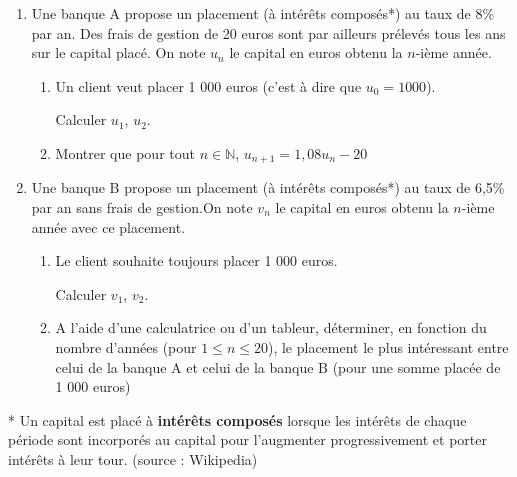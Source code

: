 
\begin{enumerate}
     \item
     Une banque A propose un placement (à intérêts composés*) au taux de 8\% par an. Des frais de gestion de 20 euros sont par ailleurs prélevés tous les ans sur le capital placé. On note $u_{n}$ le capital en euros obtenu la $n$-ième année.
     \begin{enumerate}
          \item
          Un client veut placer 1 000 euros (c'est à dire que $u_{0}=1 000$).
          \par
          Calculer $u_{1}$, $u_{2}$.
          \item
          Montrer que pour tout $n \in  \mathbb{N}$, $u_{n+1}=1,08u_{n}-20$
     \end{enumerate}
     \item
     Une banque B propose un placement (à intérêts composés*) au taux de 6,5\% par an sans frais de gestion.On note $v_{n}$ le capital en euros obtenu la $n$-ième année avec ce placement.
     \begin{enumerate}
          \item
          Le client souhaite toujours placer 1 000 euros.
          \par
          Calculer $v_{1}$, $v_{2}$.
          \item
          A l'aide d'une calculatrice ou d'un tableur, déterminer, en fonction du nombre d'années (pour $1\leqslant n\leqslant 20$), le placement le plus intéressant entre celui de la banque A et celui de la banque B (pour une somme placée de 1 000 euros)
     \end{enumerate}
\end{enumerate}
* Un capital est placé à\textbf{ intérêts composés} lorsque les intérêts de chaque période sont incorporés au capital pour l'augmenter progressivement et porter intérêts à leur tour. (source : Wikipedia)
